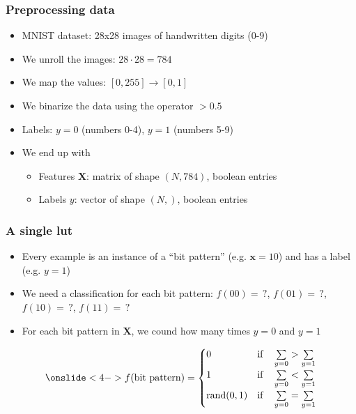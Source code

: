 \documentclass[pdflatex,compress]{beamer}
\begin{document}
\begin{frame}
	\frametitle{Preprocessing data}
	\begin{itemize}[<+->]
		\item MNIST dataset: 28x28 images of handwritten digits (0-9)
		\item We unroll the images: $28 \cdot 28 = 784$
		\item We map the values: $[0,255] \rightarrow [0,1]$
		\item We binarize the data using the operator $>0.5$
			\vspace{1em}
		\item Labels: $y=0$ (numbers 0-4), $y=1$ (numbers 5-9)
	\vspace{1em}
		\item We end up with
		\begin{itemize}
			\item Features $\bm{X}$: matrix of shape $(N, 784)$, boolean entries
			\item Labels $y$: vector of shape $(N,)$, boolean entries
		\end{itemize}
	\end{itemize}
\end{frame}

\begin{frame}
	\frametitle{A single lut}
	\begin{itemize}
		\item<1-> Every example is an instance of a \enquote{bit pattern} (e.g. $\bm{x}=10$) and has a label (e.g. $y=1$)
		\item<2-> We need a classification for each bit pattern: $f(00)=\,?$, $f(01)=\,?$, $f(10)=\,?$, $f(11)=\,?$
		\item<3-> For each bit pattern in $\bm{X}$, we cound how many times $y=0$ and $y=1$
	\end{itemize}
	\begin{align*}\onslide<4->{
		f(\text{bit pattern}) =
		\begin{cases}
			0 & \text{if} \hspace{1em} \sum\limits_{y=0} > \sum\limits_{y=1} \\
			1 & \text{if} \hspace{1em} \sum\limits_{y=0} < \sum\limits_{y=1} \\
			\text{rand}(0,1) & \text{if} \hspace{1em} \sum\limits_{y=0} = \sum\limits_{y=1}
		\end{cases}
	}
	\end{align*}
\end{frame}
\end{document}
